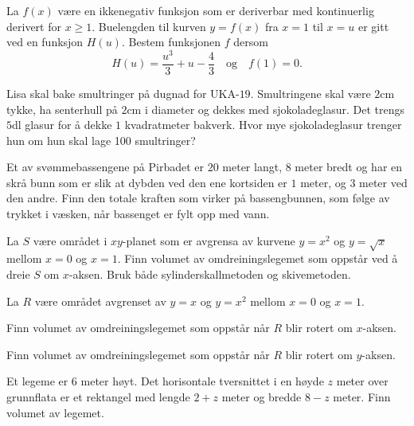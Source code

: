 \documentclass[a4paper,norsk,11pt]{interaktiv}
\begin{document}
\begin{oppgave}{3}
  La $f(x)$ være en ikkenegativ funksjon som er deriverbar med
  kontinuerlig derivert for $x \geq 1$. Buelengden til kurven
  $y = f(x)$ fra $x = 1$ til $x = u$ er gitt ved en funksjon
  $H(u)$. Bestem funksjonen $f$ dersom
  \begin{equation*}
    H(u) = \frac{u^3}{3} + u -\frac{4}{3} \quad \text{og} \quad f(1) =
    0.
  \end{equation*}
\end{oppgave}

\begin{oppgave}{4}
  Lisa skal bake smultringer på dugnad for UKA-$19$. Smultringene skal
  være $2$cm tykke, ha senterhull på $2$cm i diameter og dekkes med
  sjokoladeglasur. Det trengs $5$dl glasur for å dekke $1$
  kvadratmeter bakverk. Hvor mye sjokoladeglasur trenger hun om hun
  skal lage 100 smultringer?
\end{oppgave}

\begin{oppgave}{5}
  Et av svømmebassengene på Pirbadet er $20$ meter langt, $8$ meter
  bredt og har en skrå bunn som er slik at dybden ved den ene
  kortsiden er $1$ meter, og $3$ meter ved den andre. Finn den totale
  kraften som virker på bassengbunnen, som følge av trykket i væsken,
  når bassenget er fylt opp med vann.
\end{oppgave}


\begin{oppgave}{6}
  La $S$ være området i $xy$-planet som er avgrensa av kurvene $y=x^2$
  og $y=\sqrt{x}$ mellom $x=0$ og $x=1$. Finn volumet av
  omdreiningslegemet som oppstår ved å dreie $S$ om $x$-aksen. Bruk
  både sylinderskallmetoden og skivemetoden.\\[-6pt]
\end{oppgave}

\begin{oppgave}{7}
  La $R$ være området avgrenset av $y=x$ og $y=x^2$ mellom $x=0$ og
  $x=1$.

  \setcounter{Punkt}{0}

  \bPunkt
    Finn volumet av omdreiningslegemet som oppstår når $R$ blir rotert
    om $x$-aksen.
  \ePunkt

  \bPunkt
    Finn volumet av omdreiningslegemet som oppstår når $R$ blir rotert
    om $y$-aksen.
  \ePunkt
\end{oppgave}

\begin{oppgave}{8}
  Et legeme er 6 meter høyt. Det horisontale tversnittet i en høyde
  $z$ meter over grunnflata er et rektangel med lengde $2 + z$ meter og
  bredde $8 - z$ meter. Finn volumet av legemet.\\[-6pt]
\end{oppgave}
\end{document}
